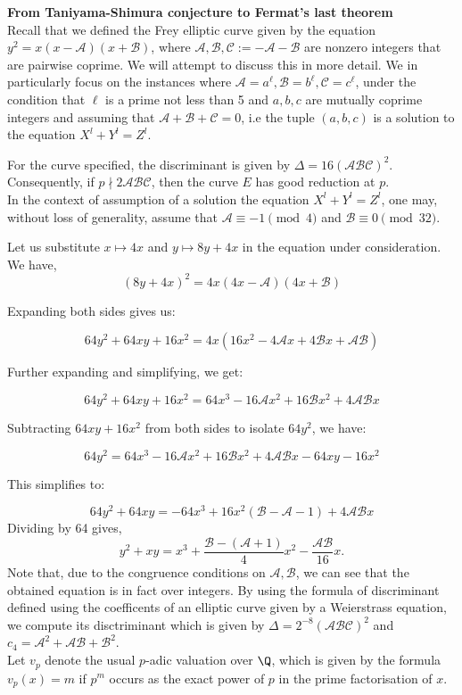 \textbf{From Taniyama-Shimura conjecture to Fermat's last theorem} \\

Recall that we defined the Frey elliptic curve given by the equation \( y^2 = x(x - \mathcal{A})(x + \mathcal{B}) \), where \( \mathcal{A}, \mathcal{B}, \mathcal{C} := -\mathcal{A} - \mathcal{B} \) are nonzero integers that are pairwise coprime. We will attempt to discuss this in more detail. We in particularly focus on the instances where \( \mathcal{A} = a^{\ell}, \mathcal{B} = b^{\ell}, \mathcal{C} = c^{\ell} \), under the condition that \( \ell \) is a prime not less than 5 and \( a, b, c \) are mutually coprime integers and assuming that $\mathcal{A}+\mathcal{B}+\mathcal{C}=0$, i.e the tuple $(a,b,c)$ is a solution to the equation $X^l+Y^l=Z^l$.

For the curve specified, the discriminant is given by \( \Delta = 16(\mathcal{A}\mathcal{B}\mathcal{C})^2 \). Consequently, if \( p \nmid 2\mathcal{A}\mathcal{B}\mathcal{C} \), then the curve \( E \) has good reduction at \( p \). \\

In the context of assumption of a solution  the equation $X^l+Y^l=Z^l$, one may, without loss of generality, assume that \( \mathcal{A} \equiv -1 \pmod{4} \) and \( \mathcal{B} \equiv 0 \pmod{32} \). 

Let us substitute \( x \mapsto 4x \) and \( y \mapsto 8y + 4x \) in the equation under consideration. We have,
\[ (8y + 4x)^2 = 4x(4x - \mathcal{A})(4x + \mathcal{B}) \]

Expanding both sides gives us:

\[ 64y^2 + 64xy + 16x^2 = 4x(16x^2 - 4\mathcal{A}x + 4\mathcal{B}x + \mathcal{A}\mathcal{B}) \]

Further expanding and simplifying, we get:

\[ 64y^2 + 64xy + 16x^2 = 64x^3 - 16\mathcal{A}x^2 + 16\mathcal{B}x^2 + 4\mathcal{A}\mathcal{B}x \]

Subtracting \( 64xy + 16x^2 \) from both sides to isolate \( 64y^2 \), we have:

\[ 64y^2 = 64x^3 - 16\mathcal{A}x^2 + 16\mathcal{B}x^2 + 4\mathcal{A}\mathcal{B}x - 64xy - 16x^2 \]

This simplifies to:

\[ 64y^2 + 64xy  = -64x^3 + 16x^2(\mathcal{B} - \mathcal{A}-1) + 4\mathcal{A}\mathcal{B}x \]
Dividing by 64 gives, 
\[
y^2 + xy = x^3 + \frac{\mathcal{B} -( \mathcal{A} + 1)}{4}x^2 - \frac{\mathcal{A}\mathcal{B}}{16}x.
\]
Note that, due to the congruence conditions on $\mathcal{A},\mathcal{B}$, we can see that the obtained equation is in fact over integers. 
By using the formula of discriminant defined using the coefficents of an elliptic curve given by a Weierstrass equation, we compute its disctriminant which is given by \( \Delta = 2^{-8}(\mathcal{A}\mathcal{B}\mathcal{C})^2 \) and \( c_{4} = \mathcal{A}^2 + \mathcal{A}\mathcal{B} + \mathcal{B}^2 \). \\
Let $v_p$ denote the usual $p$-adic valuation over $\Q$, which is given by the formula $v_p(x)=m$ if $p^m$ occurs as the exact power of $p$ in the prime factorisation of $x$. 

